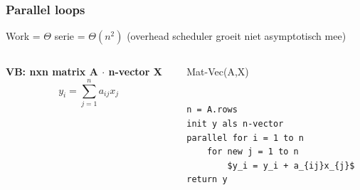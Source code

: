 \documentclass
   [kulak] %
   {kulakbeamer}
\begin{document}
\begin{frame}[fragile]
	\frametitle{Parallel loops}
	
	Work = $\Theta$ serie = $\Theta(n^2)$ (overhead scheduler groeit niet asymptotisch mee)
	
	\begin{columns}[T] %
		
		
		
		\begin{column}{.3\textwidth}
			\begin{minipage}[c][.6\textheight][c]{\linewidth}
				
				\textbf{VB: nxn matrix A $\cdot$ n-vector X}
				\\
				\[
				y_i = \sum_{j=1}^n a_{ij}x_{j}
				\]
				
			\end{minipage}
		\end{column}
		
		
		
		\begin{column}{.65\textwidth}
			
			Mat-Vec(A,X)
			\begin{lstlisting}[style=CStyle]
			
n = A.rows
init y als n-vector
parallel for i = 1 to n
	for new j = 1 to n
		$y_i = y_i + a_{ij}x_{j}$
return y
			\end{lstlisting}
			
		\end{column}

	
		
	\end{columns}
	
\end{frame}
\end{document}
